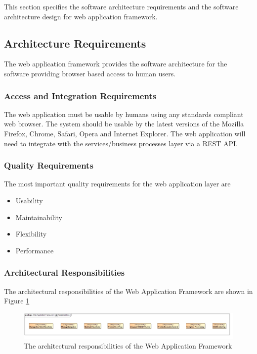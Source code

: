 This section specifies the software architecture requirements and the software
architecture design for web application framework.

\subsection{Architecture Requirements}
The web application framework provides the software architecture for the software
providing browser based access to human users.

\subsubsection{Access and Integration Requirements}
The web application must be usable by humans using any standards compliant web
browser. The system should be usable by the latest versions of the Mozilla 
Firefox, Chrome, Safari, Opera and Internet Explorer. The web
application will need to integrate with the services/business processes layer
via a REST API.

\subsubsection{Quality Requirements}
The most important quality requirements for the web application layer are
\begin{itemize}
	\item Usability
	\item Maintainability
	\item Flexibility
	\item Performance
\end{itemize}
	
\subsubsection{Architectural Responsibilities}
The architectural responsibilities of the Web Application Framework are shown in 
Figure \ref{fig:webApplicationFrameworkResponsibilities}
\begin{figure}[H]
	\begin{center}
	\includegraphics[scale=0.35]{../Diagrams and Charts/Web Application Framework/Responsibilities.jpg}
	\caption{The architectural responsibilities of the Web Application Framework}
	\label{fig:webApplicationFrameworkResponsibilities}
	\end{center}
\end{figure}

